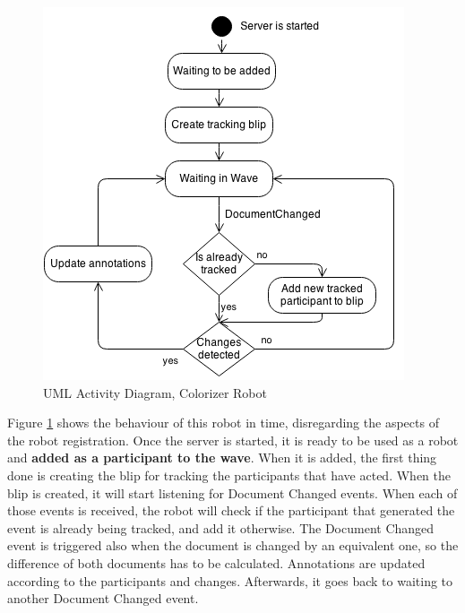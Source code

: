 \begin{figure}[h]
  \center
    \includegraphics[keepaspectratio, scale=0.65]{Media/Diagrams/Robot/RobotActivity.png}
  \caption{UML Activity Diagram, Colorizer Robot}
  \label{fig:colorizer_activity_diagram}
\end{figure}
Figure \ref{fig:colorizer_activity_diagram} shows the behaviour of this robot in time, disregarding the aspects of the robot registration. Once the server is started, it is ready to be used as a robot and \textbf{added as a participant to the wave}. When it is added, the first thing done is creating the blip for tracking the participants that have acted. When the blip is created, it will start listening for Document Changed events. When each of those events is received, the robot will check if the participant that generated the event is already being tracked, and add it otherwise. The Document Changed event is triggered also when the document is changed by an equivalent one, so the difference of both documents has to be calculated. Annotations are updated according to the participants and changes. Afterwards, it goes back to waiting to another Document Changed event.

